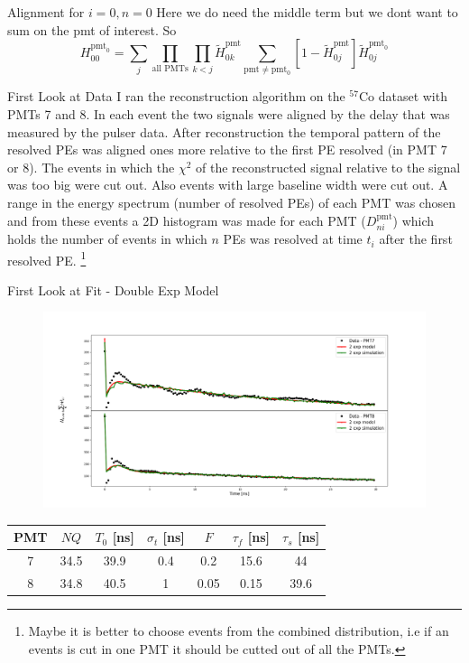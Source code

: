 \documentclass{beamer}
\newcommand\blfootnote[1]{%
  \begingroup
  \renewcommand\thefootnote{}\footnote{#1}%
  \addtocounter{footnote}{-1}%
  \endgroup
}
\begin{document}
\begin{frame}{Alignment for $i=0, n=0$}
Here we do need the middle term but we dont want to sum on the pmt of interest. So
\begin{equation}
H_{00}^{\text{pmt}_0}=\sum_j\prod_{\text{all PMTs}}\prod_{k<j}\tilde{H}_{0k}^{\text{pmt}}\sum_{\text{pmt}\neq\text{pmt}_0}[1-\tilde{H}_{0j}^{\text{pmt}}]\tilde{H}_{0j}^{\text{pmt}_0}
\end{equation}
\end{frame}

\begin{frame}{First Look at Data}
I ran the reconstruction algorithm on the $^{57}$Co dataset with PMTs 7 and 8. In each event the two signals were aligned by the delay that was measured by the pulser data. After reconstruction the temporal pattern of the resolved PEs was aligned ones more relative to the first PE resolved (in PMT 7 or 8). The events in which the $\chi^2$ of the reconstructed signal relative to the signal was too big were cut out. Also events with large baseline width were cut out. A range in the energy spectrum (number of resolved PEs) of each PMT was chosen and from these events a 2D histogram was made for each PMT ($D_{ni}^{\text{pmt}}$) which holds the number of events in which $n$ PEs was resolved at time $t_i$ after the first resolved PE.
\blfootnote{Maybe it is better to choose events from the combined distribution, i.e if an events is cut in one PMT it should be cutted out of all the PMTs.} 
\end{frame}

\begin{frame}{First Look at Fit - Double Exp Model}
\begin{figure}[h]
\includegraphics[width=1\textwidth]{fit1.png}
\end{figure}

\begin{center}
\begin{tabular}{|c||c|c|c|c|c|c|} 
\hline
PMT & $NQ$ & $T_0$ [ns]& $\sigma_t$ [ns] & $F$ & $\tau_f$ [ns] & $\tau_s$ [ns]\\ 
\hline\hline
7 & 34.5 & 39.9 & 0.4 & 0.2 & 15.6 & 44 \\
\hline
8 & 34.8 & 40.5 & 1 & 0.05 & 0.15 & 39.6 \\
\hline
\end{tabular}
\end{center} 
\end{frame}
\end{document}

